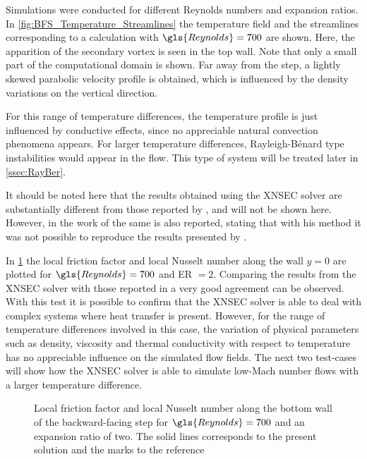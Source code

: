 Simulations were conducted for different Reynolds numbers and expansion ratios. In \cref{fig:BFS_Temperature_Streamlines} the temperature field and the streamlines corresponding to a calculation with $\gls{Reynolds} = 700$ are shown. Here, the apparition of the secondary vortex is seen in the top wall. Note that only a small part of the computational domain is shown. Far away from the step, a lightly skewed parabolic velocity profile is obtained, which is influenced by the density variations on the vertical direction.
 
 For this range of temperature differences, the temperature profile is just influenced by conductive effects, since no appreciable natural convection phenomena appears. For larger temperature differences, Rayleigh-Bénard type instabilities would appear in the flow. This type of system will be treated later in \cref{ssec:RayBer}.
 
It should be noted here that the results obtained using the XNSEC solver are substantially different from those reported by \textcite{xieFluidFlowHeat2016}, and will not be shown here. However, in the work of \textcite{henninkLowMachNumberFlow2022} the same is also reported, stating that with his method it was not possible to reproduce the results presented by \textcite{xieFluidFlowHeat2016}. 

In \cref{fig:fd_Nu_plot} the local friction factor and local Nusselt number along the wall $y = 0$ are plotted for $\gls{Reynolds} = 700$ and ER $= 2$. Comparing the results from the XNSEC solver with those reported in \textcite{henninkLowMachNumberFlow2022} a very good agreement can be observed.
With this test it is possible to confirm that the XNSEC solver is able to deal with complex systems where heat transfer is present. However, for the range of temperature differences involved in this case, the variation of physical parameters such as density, viscosity and thermal conductivity with respect to temperature has no appreciable influence on the simulated flow fields. The next two test-cases will show how the XNSEC solver is able to simulate low-Mach number flows with a larger temperature difference.
\begin{figure}[tb]
	\caption[Local friction factor and local Nusselt number along the bottom wall of the backward-facing step for $\gls{Reynolds} = 700$ and an expansion ratio of two.]{Local friction factor and local Nusselt number along the bottom wall of the backward-facing step for $\gls{Reynolds} = 700$ and an expansion ratio of two. The solid lines corresponds to the present solution and the marks to the reference \parencite{henninkLowMachNumberFlow2022}}
	\label{fig:fd_Nu_plot}
\end{figure}%
\FloatBarrier%